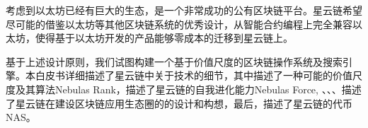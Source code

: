 考虑到以太坊已经有巨大的生态，是一个非常成功的公有区块链平台。星云链希望尽可能的借鉴以太坊等其他区块链系统的优秀设计，从智能合约编程上完全兼容以太坊，使得基于以太坊开发的产品能够零成本的迁移到星云链上。


基于上述设计原则，我们试图构建一个基于价值尺度的区块链操作系统及搜索引擎。本白皮书详细描述了星云链中关于技术的细节，其中描述了一种可能的价值尺度及其算法Nebulas
Rank，描述了星云链的自我进化能力Nebulas Force,
、、、描述了星云链在建设区块链应用生态圈的的设计和构想，最后，描述了星云链的代币NAS。
